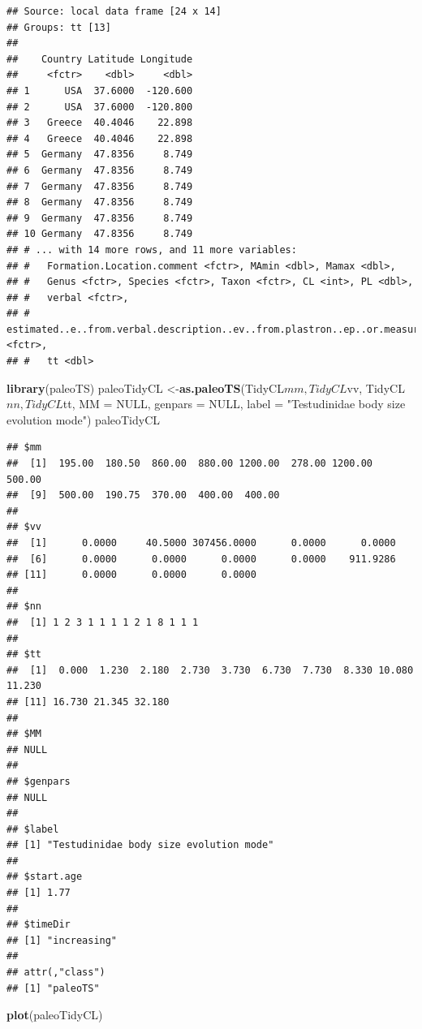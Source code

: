\documentclass[]{article}
\newenvironment{Shaded}{\begin{snugshade}}{\end{snugshade}}
\newcommand{\KeywordTok}[1]{\textcolor[rgb]{0.13,0.29,0.53}{\textbf{{#1}}}}
\newcommand{\DataTypeTok}[1]{\textcolor[rgb]{0.13,0.29,0.53}{{#1}}}
\newcommand{\StringTok}[1]{\textcolor[rgb]{0.31,0.60,0.02}{{#1}}}
\newcommand{\OtherTok}[1]{\textcolor[rgb]{0.56,0.35,0.01}{{#1}}}
\newcommand{\NormalTok}[1]{{#1}}
\begin{document}
\begin{verbatim}
## Source: local data frame [24 x 14]
## Groups: tt [13]
## 
##    Country Latitude Longitude
##     <fctr>    <dbl>     <dbl>
## 1      USA  37.6000  -120.600
## 2      USA  37.6000  -120.800
## 3   Greece  40.4046    22.898
## 4   Greece  40.4046    22.898
## 5  Germany  47.8356     8.749
## 6  Germany  47.8356     8.749
## 7  Germany  47.8356     8.749
## 8  Germany  47.8356     8.749
## 9  Germany  47.8356     8.749
## 10 Germany  47.8356     8.749
## # ... with 14 more rows, and 11 more variables:
## #   Formation.Location.comment <fctr>, MAmin <dbl>, Mamax <dbl>,
## #   Genus <fctr>, Species <fctr>, Taxon <fctr>, CL <int>, PL <dbl>,
## #   verbal <fctr>,
## #   estimated..e..from.verbal.description..ev..from.plastron..ep..or.measured..m..measured.from.figure..mf.. <fctr>,
## #   tt <dbl>
\end{verbatim}

\begin{Shaded}
\begin{Highlighting}[]
\KeywordTok{library}\NormalTok{(paleoTS)}
\NormalTok{paleoTidyCL <-}\KeywordTok{as.paleoTS}\NormalTok{(TidyCL$mm, TidyCL$vv, TidyCL$nn, TidyCL$tt, }\DataTypeTok{MM =} \OtherTok{NULL}\NormalTok{, }\DataTypeTok{genpars =} \OtherTok{NULL}\NormalTok{, }\DataTypeTok{label =} \StringTok{"Testudinidae body size evolution mode"}\NormalTok{)}
\NormalTok{paleoTidyCL}
\end{Highlighting}
\end{Shaded}

\begin{verbatim}
## $mm
##  [1]  195.00  180.50  860.00  880.00 1200.00  278.00 1200.00  500.00
##  [9]  500.00  190.75  370.00  400.00  400.00
## 
## $vv
##  [1]      0.0000     40.5000 307456.0000      0.0000      0.0000
##  [6]      0.0000      0.0000      0.0000      0.0000    911.9286
## [11]      0.0000      0.0000      0.0000
## 
## $nn
##  [1] 1 2 3 1 1 1 1 2 1 8 1 1 1
## 
## $tt
##  [1]  0.000  1.230  2.180  2.730  3.730  6.730  7.730  8.330 10.080 11.230
## [11] 16.730 21.345 32.180
## 
## $MM
## NULL
## 
## $genpars
## NULL
## 
## $label
## [1] "Testudinidae body size evolution mode"
## 
## $start.age
## [1] 1.77
## 
## $timeDir
## [1] "increasing"
## 
## attr(,"class")
## [1] "paleoTS"
\end{verbatim}

\begin{Shaded}
\begin{Highlighting}[]
\KeywordTok{plot}\NormalTok{(paleoTidyCL)}
\end{Highlighting}
\end{Shaded}
\end{document}
